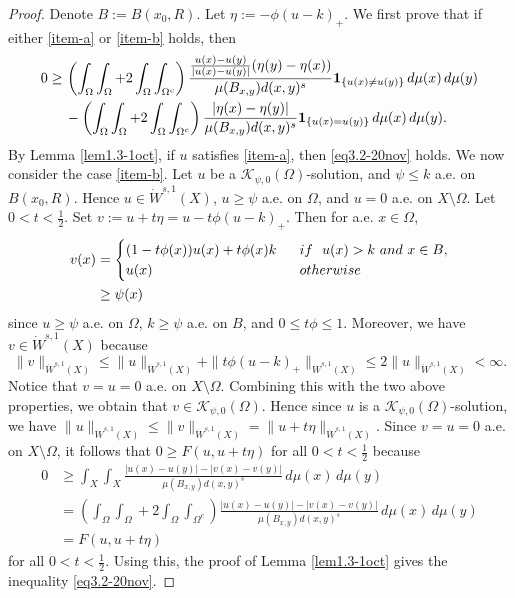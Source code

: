 \documentclass[10pt,a4paper]{amsart}
\begin{document}
	\begin{proof}
		Denote $B:=B(x_0,R)$. 
		Let $\eta:=-\phi (u-k)_+$.  We first prove that if  either  \ref{item-a} or \ref{item-b} holds, then 
		{
			\begin{align}\notag
				0\geq&\, \left( \int_\Omega\int_\Omega +2\int_\Omega\int_{\Omega^c} \right) \frac{\frac{u(x)-u(y)}{|u(x)-u(y)|} (\eta(y)-\eta(x)) }{\mu(B_{x,y}) d(x,y)^s} {\bf 1}_{\{u(x)\neq u(y) \}} \,d\mu(x)\,d\mu(y)\\
				&\, - \left( \int_\Omega\int_\Omega +2\int_\Omega\int_{\Omega^c} \right) \frac{ |\eta(x)-\eta(y)| }{\mu(B_{x,y}) d(x,y)^s} {\bf 1}_{\{u(x)=u(y)\}}\,d\mu(x)\,d\mu(y) \label{eq3.2-20nov}.
			\end{align}
		}
		By Lemma \ref{lem1.3-1oct}, if $u$ satisfies \ref{item-a}, then  \eqref{eq3.2-20nov}  holds.
		We now consider the case \ref{item-b}. Let $u$ be a $\mathcal{K}_{\psi,0}(\Omega)$-solution,
		and $\psi\leq k$ a.e. on $B(x_0,R)$. Hence $u\in \dot W^{s,1}(X)$,
		$u\geq \psi$ a.e. on $\Omega$, and $u=0$ a.e. on $X\setminus\Omega$.
		Let $0<t<\frac{1}{2}$. Set $v:=u+t\eta=u-t\phi(u-k)_+$. Then for a.e. $x\in\Omega$,
		\begin{align*}
			v(x)& =  \begin{cases}
				(1-t\phi(x))u(x)+t\phi(x) k& {\rm \ \ if\ \ }u(x)>k {\rm \ and\ }x\in B,\\
				u(x)& {\rm \ \ otherwise\ \ }
			\end{cases}\\
			&\geq   \psi(x)
		\end{align*}
		since $u\geq \psi$ a.e. on $\Omega$, $k\geq \psi$ a.e. on $B$, and $0\leq t\phi\leq 1$.
		Moreover, we have $v\in \dot W^{s,1}(X)$ because 
		\[
		\|v\|_{\dot W^{s,1}(X)}
		\leq 
		{ \|u\|_{\dot W^{s,1}(X)} }
		+\|t\phi(u-k)_+\|_{\dot W^{s,1}(X)}
		\leq 2 \|u\|_{\dot W^{s,1}(X)}<\infty.
		\]
		Notice that   $v=u=0$ a.e. on $X\setminus\Omega$. 
		Combining this with the two above properties, we obtain that
		$v\in \mathcal K_{\psi,0}(\Omega)$. Hence since $u$ is a $\mathcal{K}_{\psi,0}(\Omega)$-solution,
		we have $\|u\|_{\dot W^{s,1}(X)}\leq \|v\|_{\dot W^{s,1}(X)}=\|u+t\eta\|_{\dot W^{s,1}(X)}$.
		Since $v=u=0$ a.e. on $X\setminus\Omega$, it follows that 
		{ $0\geq F(u,u+t\eta)$ for  all $0<t<\frac{1}{2}$ because 
			\begin{align*}
				0
				&\geq  \int_X\int_X \frac{|u(x)-u(y)|-|v(x)-v(y)|}{\mu(B_{x,y})d(x,y)^s}\,d\mu(x)\,d\mu(y)\\
				&=\left(\int_{\Omega}\int_{\Omega}+2\int_{\Omega}\int_{\Omega^c} \right)\frac{|u(x)-u(y)|-|v(x)-v(y)|}{\mu(B_{x,y})d(x,y)^s}\,d\mu(x)\,d\mu(y)\\
				& = F(u,u+t\eta)
			\end{align*}
			for all $0<t<\frac{1}{2}$. 
		}
		Using this, the proof of Lemma \ref{lem1.3-1oct} gives the inequality \eqref{eq3.2-20nov}.
		

\end{proof}
\end{document}
